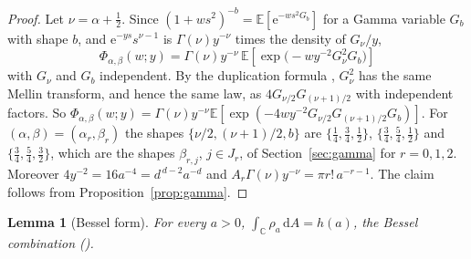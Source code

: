 \documentclass[twoside,10pt]{article}
\numberwithin{equation}{section}
\theoremstyle{slbody}
\newtheorem{lemma}[theorem]{Lemma}
\theoremstyle{remark}
\newcommand{\C}{\mathbb C}
\newcommand{\dd}{\,\mathrm d}
\newcommand{\e}{\mathrm e}
\newcommand{\E}{\mathbb E}
\renewcommand{\eqref}[1]{%
  \textup{{\normalfont(\oldstylenums{\ref{#1}}}\normalfont)}}
\begin{document}
\begin{proof}
Let \(\nu=\alpha+\frac12\).  Since \((1+ws^2)^{-b}=\E[\e^{-ws^2G_b}]\)
for a Gamma variable \(G_b\) with shape \(b\), and \(\e^{-ys}s^{\nu-1}\)
is \(\Gamma(\nu)y^{-\nu}\) times the density of \(G_\nu/y\),
\[
\Phi_{\alpha,\beta}(w;y)
=\Gamma(\nu)y^{-\nu}\,\E\left[\exp\bigl(-wy^{-2}G_\nu^2G_b\bigr)\right]
\]
with \(G_\nu\) and \(G_b\) independent.  By the duplication formula
\cite[equation~(5.5.5)]{NISTHandbook2010}, \(G_\nu^2\) has the same
Mellin transform, and hence the same law, as \(4G_{\nu/2}G_{(\nu+1)/2}\)
with independent factors.  So \(\Phi_{\alpha,\beta}(w;y)
=\Gamma(\nu)y^{-\nu}\E[\exp(-4wy^{-2}G_{\nu/2}G_{(\nu+1)/2}G_b)]\).  For
\((\alpha,\beta)=(\alpha_r,\beta_r)\) the shapes
\(\{\nu/2,(\nu+1)/2,b\}\) are \(\{\frac14,\frac34,\frac12\}\),
\(\{\frac34,\frac54,\frac12\}\) and \(\{\frac34,\frac54,\frac32\}\), which
are the shapes \(\beta_{r,j}\), \(j\in J_r\), of
Section~\ref{sec:gamma} for \(r=0,1,2\).  Moreover
\(4y^{-2}=16a^{-4}=d^{\,d-2}a^{-d}\) and
\(A_r\Gamma(\nu)y^{-\nu}=\pi r!\,a^{-r-1}\).  The claim follows from
Proposition~\ref{prop:gamma}.
\end{proof}

\begin{lemma}[Bessel form]\label{lem:bessel}
For every \(a>0\),
\(\int_\C\rho_a\dd A=h(a)\), the Bessel combination \eqref{eq:h-bessel}.
\end{lemma}
\end{document}
